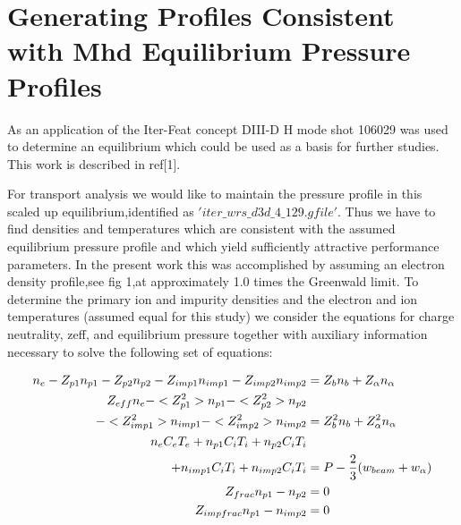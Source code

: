        \section{ Generating Profiles Consistent with Mhd Equilibrium
         Pressure Profiles}
       As an application of the Iter-Feat concept DIII-D H mode shot
       106029 was used to determine an equilibrium which could
       be used as a basis for further studies. This work is described
       in ref[1].
       
       For transport analysis we would like to maintain the pressure
       profile in this scaled up equilibrium,identified as
       $'iter\_wrs\_d3d\_4\_129.gfile'$. Thus we have to find
       densities and temperatures which are consistent with the
       assumed equilibrium pressure profile and which yield
       sufficiently attractive performance parameters. In the present
       work this was accomplished by assuming an electron density
       profile,see fig 1,at approximately 1.0 times the Greenwald
       limit. To determine the primary ion and impurity densities and 
       the electron and ion temperatures (assumed equal for this
       study) we consider the equations for charge neutrality, zeff,
       and equilibrium pressure together with  auxiliary 
       information necessary to solve the following set of equations:

          \begin{align} \label {zeff-ref}
             n_{e} -Z_{p1}n_{p1}  -Z_{p2}n_{p2}  -Z_{imp1}n_{imp1}
             -Z_{imp2}n_{imp2} &= Z_bn_b +Z_{\alpha}n_{\alpha}\\
             Z_{eff} n_{e} -<Z_{p1}^2>n_{p1}-<Z_{p2}^2>n_{p2} \notag
             \\ 
              -<Z_{imp1}^2>n_{imp1}-<Z_{imp2}^2>n_{imp2} &=
              Z_b^2n_b +Z_{\alpha}^2n_{\alpha} \\
             n_{e}C_eT_e +n_{p1}C_iT_i+ n_{p2}C_iT_i \notag \\
             +n_{imp1}C_iT_i
             +n_{imp2}C_iT_i &= P - \frac{2}{3}(w_{beam}+w_{\alpha})\\
           Z_{frac}n_{p1} - n_{p2} &= 0 \\
           Z_{impfrac}n_{p1} - n_{imp2} &=0 
         \end{align} 

